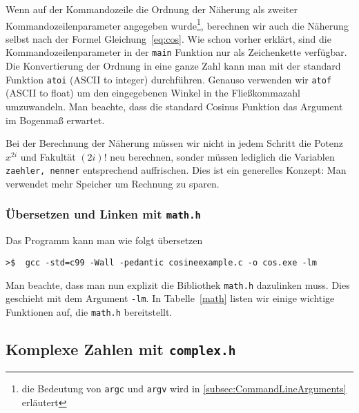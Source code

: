 Wenn auf der Kommandozeile die Ordnung der Näherung als zweiter Kommandozeilenparameter angegeben wurde\footnote{die Bedeutung von \texttt{argc} und \texttt{argv} wird in \cref{subsec:CommandLineArguments} erläutert}, berechnen wir auch die Näherung selbst nach der Formel Gleichung~\ref{eq:cos}.
Wie schon vorher erklärt, sind die Kommandozeilenparameter in der \texttt{main} Funktion nur als Zeichenkette verfügbar.
Die Konvertierung der Ordnung in eine ganze Zahl kann man mit der standard Funktion \texttt{atoi} (ASCII to integer) durchführen.
Genauso verwenden wir \texttt{atof} (ASCII to float) um den eingegebenen Winkel in the Fließkommazahl umzuwandeln.
Man beachte, dass die standard Cosinus Funktion das Argument im Bogenmaß erwartet.

Bei der Berechnung der Näherung müssen wir nicht in jedem Schritt die Potenz $x^{2i}$ und Fakultät $(2i)!$ neu berechnen, sonder müssen lediglich die Variablen \texttt{zaehler, nenner} entsprechend auffrischen.
Dies ist ein generelles Konzept: Man verwendet mehr Speicher um Rechnung zu sparen.

\subsubsection{Übersetzen und Linken mit \texttt{math.h}}

Das Programm kann man wie folgt übersetzen

\vspace*{0.5cm}
\begin{verbatim}
>$  gcc -std=c99 -Wall -pedantic cosineexample.c -o cos.exe -lm
\end{verbatim}
\vspace*{0.5cm}

\noindent Man beachte, dass man nun explizit die Bibliothek \texttt{math.h} dazulinken muss.
Dies geschieht mit dem Argument \texttt{-lm}.
In Tabelle~\ref{math} listen wir einige wichtige Funktionen auf, die \texttt{math.h} bereitstellt.

\subsection{Komplexe Zahlen mit \texttt{complex.h}}

